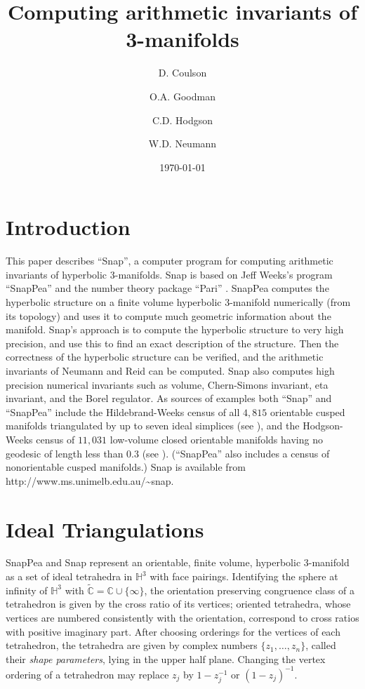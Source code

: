 \documentclass[a4paper]{amsart}
\title{Computing arithmetic invariants of 3-manifolds}
\author{D. Coulson}
\author{O.A. Goodman}
\author{C.D. Hodgson}
\author{W.D. Neumann}
\date{\today}
\def\H{{\mathbb H}}
\def\C{{\mathbb C}}
\theoremstyle{definition}
\begin{document}
\maketitle

\section{Introduction}

This paper describes ``Snap'', a computer program for computing
arithmetic invariants of hyperbolic 3-manifolds. Snap is based on Jeff
Weeks's program ``SnapPea'' \cite{snappea} and the number theory
package ``Pari'' \cite{pari}. SnapPea computes the hyperbolic
structure on a finite volume hyperbolic 3-manifold numerically (from
its topology) and uses it to compute much geometric information about
the manifold. Snap's approach is to compute the hyperbolic structure
to very high precision, and use this to find an exact description of
the structure. Then the correctness of the hyperbolic structure can be
verified, and the arithmetic invariants of Neumann and Reid \cite{nr1}
can be computed. Snap also computes high precision numerical
invariants such as volume, Chern-Simons invariant, eta invariant, and
the Borel regulator.  As sources of examples both ``Snap'' and
``SnapPea'' include the Hildebrand-Weeks census of all $4,815$
orientable cusped manifolds triangulated by up to seven ideal
simplices (see \cite{HiW}), and the Hodgson-Weeks census of $11,031$ low-volume closed
orientable manifolds having no geodesic of length less than $0.3$ (see \cite{Ho-We}).
(``SnapPea'' also includes a census of nonorientable cusped manifolds.)
Snap is available from http://www.ms.unimelb.edu.au/\~{}snap.

\section{Ideal Triangulations}

\def\Ct{\tilde{\C}}

SnapPea and Snap represent an orientable, finite volume, hyperbolic
3-manifold as a set of ideal tetrahedra in $\H^3$ with face
pairings. Identifying the sphere at infinity of $\H^3$ with $\Ct = \C
\cup \{\infty\}$, the orientation preserving congruence class of a 
tetrahedron is given by the cross ratio of its vertices; oriented
tetrahedra, whose vertices are numbered consistently with the
orientation, correspond to cross ratios with positive imaginary part.
After choosing orderings for the vertices of each tetrahedron, 
the tetrahedra are given by complex numbers
$\{z_1,\ldots,z_n\}$, called their {\em shape parameters}, lying in
the upper half plane.
Changing the vertex ordering of a tetrahedron may replace
$z_j$ by $1-z_j^{-1}$ or $(1-z_j)^{-1}$.
\end{document}
